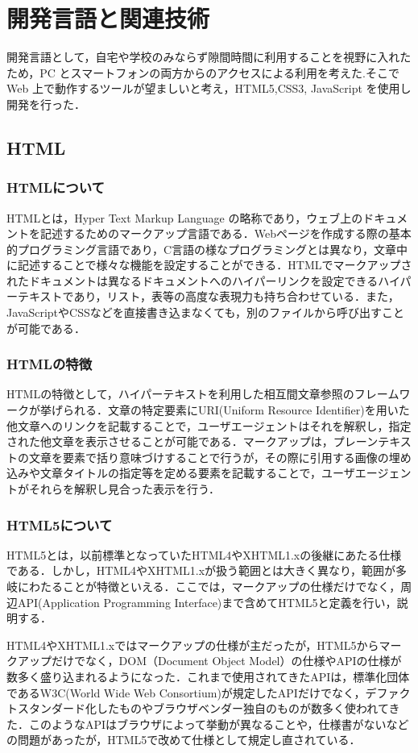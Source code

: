\documentclass[a4j,12pt]{jarticle}
\begin{document}
\newpage
\section{開発言語と関連技術}
開発言語として，自宅や学校のみならず隙間時間に利用することを視野に入れたため，PC とスマートフォンの両方からのアクセスによる利用を考えた.そこで Web 上で動作するツールが望ましいと考え，HTML5,CSS3, JavaScript を使用し開発を行った．
\subsection{HTML}
\subsubsection{HTMLについて}
HTMLとは，Hyper Text Markup Language の略称であり，ウェブ上のドキュメントを記述するためのマークアップ言語である．Webページを作成する際の基本的プログラミング言語であり，C言語の様なプログラミングとは異なり，文章中に記述することで様々な機能を設定することができる．HTMLでマークアップされたドキュメントは異なるドキュメントへのハイパーリンクを設定できるハイパーテキストであり，リスト，表等の高度な表現力も持ち合わせている．また，JavaScriptやCSSなどを直接書き込まなくても，別のファイルから呼び出すことが可能である\cite{ren8}．
\subsubsection{HTMLの特徴}
HTMLの特徴として，ハイパーテキストを利用した相互間文章参照のフレームワークが挙げられる．文章の特定要素にURI(Uniform Resource Identifier)を用いた他文章へのリンクを記載することで，ユーザエージェントはそれを解釈し，指定された他文章を表示させることが可能である．マークアップは，プレーンテキストの文章を要素で括り意味づけすることで行うが，その際に引用する画像の埋め込みや文章タイトルの指定等を定める要素を記載することで，ユーザエージェントがそれらを解釈し見合った表示を行う\cite{ren8}．
\subsubsection{HTML5について}
HTML5とは，以前標準となっていたHTML4やXHTML1.xの後継にあたる仕様である．しかし，HTML4やXHTML1.xが扱う範囲とは大きく異なり，範囲が多岐にわたることが特徴といえる．ここでは，マークアップの仕様だけでなく，周辺API(Application Programming Interface)まで含めてHTML5と定義を行い，説明する．

HTML4やXHTML1.xではマークアップの仕様が主だったが，HTML5からマークアップだけでなく，DOM（Document Object Model）の仕様やAPIの仕様が数多く盛り込まれるようになった．これまで使用されてきたAPIは，標準化団体であるW3C(World Wide Web Consortium)が規定したAPIだけでなく，デファクトスタンダード化したものやブラウザベンダー独自のものが数多く使われてきた．このようなAPIはブラウザによって挙動が異なることや，仕様書がないなどの問題があったが，HTML5で改めて仕様として規定し直されている．
\end{document}
